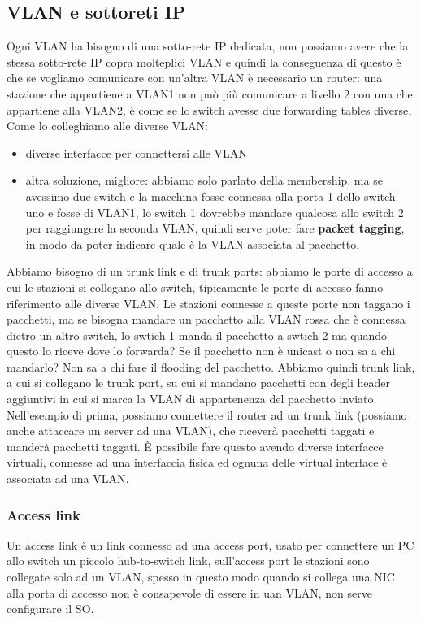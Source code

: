 \documentclass[12pt, oneside]{extbook} %
\begin{document}
\subsection{VLAN e sottoreti IP}
Ogni VLAN ha bisogno di una sotto-rete IP dedicata, non possiamo avere che la stessa sotto-rete IP copra molteplici VLAN e quindi la conseguenza di questo è che se vogliamo comunicare con un'altra VLAN è necessario un router: una stazione che appartiene a VLAN1 non può più comunicare a livello 2 con una che appartiene alla VLAN2, è come se lo switch avesse due forwarding tables diverse.\\ Come lo colleghiamo alle diverse VLAN:
\begin{itemize}
\item diverse interfacce per connettersi alle VLAN
\item altra soluzione, migliore: abbiamo solo parlato della membership, ma se avessimo due switch e la macchina fosse connessa alla porta 1 dello switch uno e fosse di VLAN1, lo switch 1 dovrebbe mandare qualcosa allo switch 2 per raggiungere la seconda VLAN, quindi serve poter fare \textbf{packet tagging}, in modo da poter indicare quale è la VLAN associata al pacchetto.
\end{itemize}
Abbiamo bisogno di un trunk link e di trunk ports: abbiamo le porte di accesso a cui le stazioni si collegano allo switch, tipicamente le porte di accesso fanno riferimento alle diverse VLAN. Le stazioni connesse a queste porte non taggano i pacchetti, ma se bisogna mandare un pacchetto alla VLAN rossa che è connessa dietro un altro switch, lo swtich 1 manda il pacchetto a swtich 2 ma quando questo lo riceve dove lo forwarda? Se il pacchetto non è unicast o non sa a chi mandarlo? Non sa a chi fare il flooding del pacchetto.
Abbiamo quindi trunk link, a cui si collegano le trunk port, su cui si mandano pacchetti con degli header aggiuntivi in cui si marca la VLAN di appartenenza del pacchetto inviato.\\ Nell'esempio di prima, possiamo connettere il router ad un trunk link (possiamo anche attaccare un server ad una VLAN), che riceverà pacchetti taggati e manderà pacchetti taggati. È possibile fare questo avendo diverse interfacce virtuali, connesse ad una interfaccia fisica ed ognuna delle virtual interface è associata ad una VLAN.
\subsubsection{Access link}
Un access link è un link connesso ad una access port, usato per connettere un PC allo switch un piccolo hub-to-switch link, sull'access port le stazioni sono collegate solo ad un VLAN, spesso in questo modo quando si collega una NIC alla porta di accesso non è consapevole di essere in uan VLAN, non serve configurare il SO.
\end{document}
